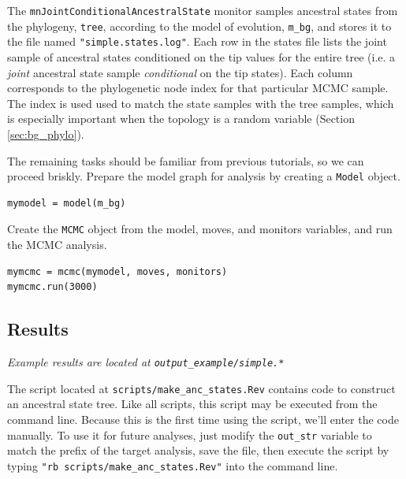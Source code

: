 The {\tt mnJointConditionalAncestralState} monitor samples ancestral states from the phylogeny, {\tt tree}, according to the model of evolution, {\tt m\_bg}, and stores it to the file named {\tt "simple.states.log"}.
Each row in the states file lists the joint sample of ancestral states conditioned on the tip values for the entire tree (i.e. a {\it joint} ancestral state sample {\it conditional} on the tip states).
Each column corresponds to the phylogenetic node index for that particular MCMC sample.
The index is used used to match the state samples with the tree samples, which is especially important when the topology is a random variable (Section \ref{sec:bg_phylo}).

The remaining tasks should be familiar from previous tutorials, so we can proceed briskly.
Prepare the model graph for analysis by creating a {\tt Model} object.
\begin{snugshade}
\begin{lstlisting}
mymodel = model(m_bg)
\end{lstlisting}
\end{snugshade}


Create the {\tt MCMC} object from the model, moves, and monitors variables, and run the MCMC analysis.
\begin{snugshade}
\begin{lstlisting}
mymcmc = mcmc(mymodel, moves, monitors)
mymcmc.run(3000)
\end{lstlisting}
\end{snugshade}

\subsection*{Results}

\begin{center}
{\it Example results are located at \tt{output\_example/simple.*}}
\end{center}

The script located at {\tt scripts/make\_anc\_states.Rev} contains code to construct an ancestral state tree.
Like all \RevBayes scripts, this script may be executed from the command line.
Because this is the first time using the script, we'll enter the code manually.
To use it for future analyses, just modify the {\tt out\_str} variable to match the prefix of the target analysis, save the file, then execute the script by typing {\tt "rb scripts/make\_anc\_states.Rev"} into the command line.

